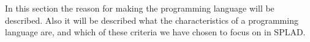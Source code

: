 In this section the reason for making the programming language will be described. Also it will be described what the characteristics of a programming language are, and which of these criteria we have chosen to focus on in SPLAD.